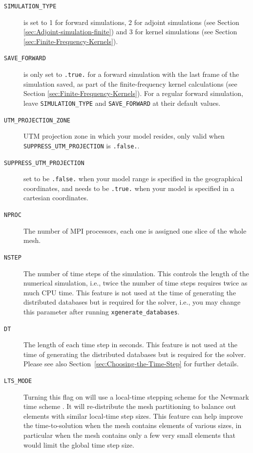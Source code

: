 \begin{description}
\item [{\texttt{SIMULATION\_TYPE}}] is set to 1 for forward simulations,
2 for adjoint simulations (see Section \ref{sec:Adjoint-simulation-finite})
and 3 for kernel simulations (see Section \ref{sec:Finite-Frequency-Kernels}).
%
\item [{\texttt{SAVE\_FORWARD}}] is only set to \texttt{.true.} for a forward
simulation with the last frame of the simulation saved, as part of
the finite-frequency kernel calculations (see Section \ref{sec:Finite-Frequency-Kernels}).
For a regular forward simulation, leave \texttt{SIMULATION\_TYPE}
and \texttt{SAVE\_FORWARD} at their default values.
%
\item [{\texttt{UTM\_PROJECTION\_ZONE}}] UTM projection zone in
which your model resides, only valid when \texttt{SUPPRESS\_UTM\_PROJECTION} is \texttt{.false.}.
%
\item [{\texttt{SUPPRESS\_UTM\_PROJECTION}}] set to be \texttt{.false.}
when your model range is specified in the geographical coordinates,
and needs to be \texttt{.true.} when your model is specified in a
cartesian coordinates. 
%
\item [{\texttt{NPROC}}] The number of MPI processors, each one is assigned
one slice of the whole mesh.
%
\item [{\texttt{NSTEP}}] The number of time steps of the simulation. This
controls the length of the numerical simulation, i.e., twice the number
of time steps requires twice as much CPU time. This feature is not
used at the time of generating the distributed databases but is required
for the solver, i.e., you may change this parameter after running
\texttt{xgenerate\_databases}.
%
\item [{\texttt{DT}}] The length of each time step in seconds. This feature
is not used at the time of generating the distributed databases but
is required for the solver. Please see also Section~\ref{sec:Choosing-the-Time-Step}
for further details.
%
\item [{\texttt{LTS\_MODE}}] Turning this flag on will use a local-time stepping scheme for the Newmark time scheme \citep{Rietmann2015,Rietmann2016}.
It will re-distribute the mesh partitioning to balance out elements with similar local-time step sizes.
This feature can help improve the time-to-solution when the mesh contains elements of various sizes,
in particular when the mesh contains only a few very small elements that would limit the global time step size.

\end{description}

